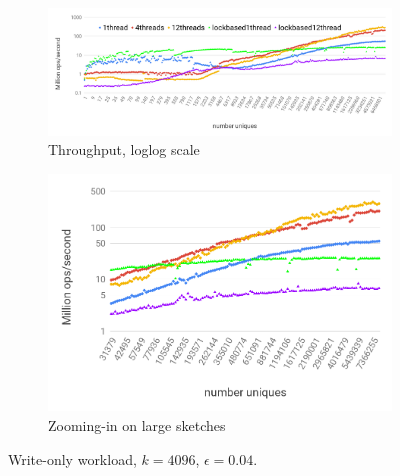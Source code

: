 \begin{figure}[tb]
\setlength{\abovecaptionskip}{0pt}
\setlength{\belowcaptionskip}{0pt}
\setlength\textfloatsep{0pt}
\centering
\begin{subfigure}{\columnwidth}\centering
\includegraphics[width=\textwidth]{graphics/fast-concurrent/theta-write-only.png}
\caption{Throughput, loglog scale}
\label{fc-fig:throughput:native}
\end{subfigure}
\begin{subfigure}{\columnwidth}\centering
\includegraphics[width=\textwidth]{graphics/fast-concurrent/theta-write-only-zoomin.png}
\caption{Zooming-in on large sketches}
\label{fc-fig:throughput:large}
\end{subfigure}
  \caption{Write-only workload, $k = 4096$, $\epsilon=0.04$.}
  \label{fc-fig:throughput}
\end{figure}



